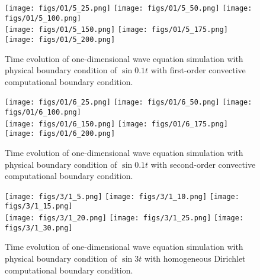 \documentclass[11pt]{article}
\begin{document}
\begin{enumerate}
        \begin{figure}[ht]
        \begin{center}
        \texttt{[image: figs/01/5\_25.png]}
        \texttt{[image: figs/01/5\_50.png]}
        \texttt{[image: figs/01/5\_100.png]}\\
        \texttt{[image: figs/01/5\_150.png]}
        \texttt{[image: figs/01/5\_175.png]}
        \texttt{[image: figs/01/5\_200.png]}\\
        \end{center}
        \caption{Time evolution of one-dimensional wave equation simulation with physical boundary condition
                of $\sin 0.1 t$ with first-order convective computational boundary condition.}
        \label{fig2_5}
        \end{figure}

      \begin{figure}[ht]
        \begin{center}
        \texttt{[image: figs/01/6\_25.png]}
        \texttt{[image: figs/01/6\_50.png]}
        \texttt{[image: figs/01/6\_100.png]}\\
        \texttt{[image: figs/01/6\_150.png]}
        \texttt{[image: figs/01/6\_175.png]}
        \texttt{[image: figs/01/6\_200.png]}\\
        \end{center}
        \caption{Time evolution of one-dimensional wave equation simulation with physical boundary condition
                of $\sin 0.1 t$ with second-order convective computational boundary condition.}
        \label{fig2_5}
        \end{figure}


        \begin{figure}[ht]
        \begin{center}
        \texttt{[image: figs/3/1\_5.png]}
        \texttt{[image: figs/3/1\_10.png]}
        \texttt{[image: figs/3/1\_15.png]}\\
        \texttt{[image: figs/3/1\_20.png]}
        \texttt{[image: figs/3/1\_25.png]}
        \texttt{[image: figs/3/1\_30.png]}\\
        \end{center}
        \caption{Time evolution of one-dimensional wave equation simulation with physical boundary condition
                of $\sin 3 t$ with homogeneous Dirichlet computational boundary condition.}
        \label{fig2_1}
        \end{figure}


\end{enumerate}
\end{document}
